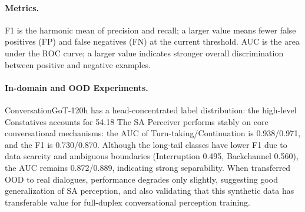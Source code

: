 \paragraph{Metrics.}F1 is the harmonic mean of precision and recall; a larger value means fewer false positives (FP) and false negatives (FN) at the current threshold. AUC is the area under the ROC curve; a larger value indicates stronger overall discrimination between positive and negative examples.
\paragraph{In-domain and OOD Experiments.}
ConversationGoT-120h has a head-concentrated label distribution: the high-level Constatives accounts for 54.18%
The SA Perceiver performs stably on core conversational mechanisms: the AUC of Turn-taking/Continuation is 0.938/0.971, and the F1 is 0.730/0.870. Although the long-tail classes have lower F1 due to data scarcity and ambiguous boundaries (Interruption 0.495, Backchannel 0.560), the AUC remains 0.872/0.889, indicating strong separability.
When transferred OOD to real dialogues, performance degrades only slightly, suggesting good generalization of SA perception, and also validating that this synthetic data has transferable value for full-duplex conversational perception training.
\begin{table}[t]
\centering
\caption{In-domain: Per-class metrics for High-level and Low-level Speech Acts.}
\label{tab:simulation_results-detection}
\scriptsize
{}
\end{table}
